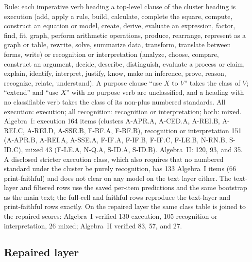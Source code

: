 Rule: each imperative verb heading a top-level clause of the cluster heading is execution (add, apply a rule, build, calculate, complete the square, compute, construct an equation or model, create, derive, evaluate an expression, factor, find, fit, graph, perform arithmetic operations, produce, rearrange, represent as a graph or table, rewrite, solve, summarize data, transform, translate between forms, write) or recognition or interpretation (analyze, choose, compare, construct an argument, decide, describe, distinguish, evaluate a process or claim, explain, identify, interpret, justify, know, make an inference, prove, reason, recognize, relate, understand). A purpose clause ``use $X$ to $V$'' takes the class of $V$; ``extend'' and ``use $X$'' with no purpose verb are unclassified, and a heading with no classifiable verb takes the class of its non-plus numbered standards. All execution: execution; all recognition: recognition or interpretation; both: mixed. Algebra~I: execution 164 items (clusters A-APR.A, A-CED.A, A-REI.B, A-REI.C, A-REI.D, A-SSE.B, F-BF.A, F-BF.B), recognition or interpretation 151 (A-APR.B, A-REI.A, A-SSE.A, F-IF.A, F-IF.B, F-IF.C, F-LE.B, N-RN.B, S-ID.C), mixed 43 (F-LE.A, N-Q.A, S-ID.A, S-ID.B). Algebra~II: 120, 93, and 35. A disclosed stricter execution class, which also requires that no numbered standard under the cluster be purely recognition, has 133 Algebra~I items (66 print-faithful) and does not clear on any model on the text layer either. The text-layer and filtered rows use the saved per-item predictions and the same bootstrap as the main text; the full-cell and faithful rows reproduce the text-layer and print-faithful rows exactly. On the repaired layer the same class table is joined to the repaired scores: Algebra~I verified 130 execution, 105 recognition or interpretation, 26 mixed; Algebra~II verified 83, 57, and 27.

\subsection{Repaired layer}
\label{app:repair}

